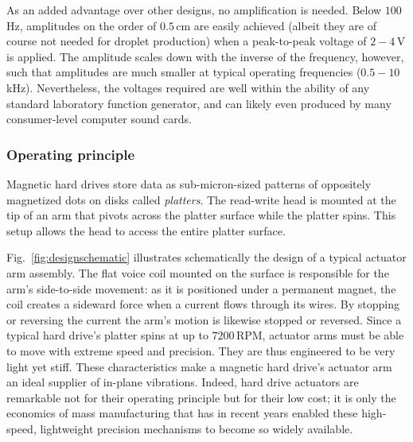 \documentclass[11.5pt]{book}
\newcommand*{\figref}[1]{Fig.~\ref{#1}}
\begin{document}
As an added advantage over other designs, no amplification is needed. Below
$100\,$Hz, amplitudes on the order of $0.5\,$cm are easily achieved (albeit they
are of course not needed for droplet production) when a peak-to-peak voltage of
$2-4\,$V is applied. The amplitude scales down with the inverse of the frequency,
however, such that amplitudes are much smaller at typical operating frequencies
($0.5-10\,$kHz). Nevertheless, the voltages required are well within the ability
of any standard laboratory function generator, and can likely even produced by many
consumer-level computer sound cards.

\subsubsection{Operating principle}
Magnetic hard drives store data as sub-micron-sized patterns of 
oppositely magnetized dots on disks called \emph{platters}. The read-write head
is mounted at the tip of an arm that pivots across the platter surface while the
platter spins. This setup allows the head to access the entire platter surface.

\figref{fig:designschematic} illustrates schematically the design of a typical
actuator arm assembly. The flat voice coil mounted on the surface is responsible
for the arm's side-to-side movement: as it is positioned under a permanent
magnet, the coil creates a sideward force when a current flows through its
wires. By stopping or reversing the current the arm's motion is likewise stopped
or reversed. Since a typical hard drive's platter spins at up to $7200\,$RPM,
actuator arms must be able to move with extreme speed and precision. They are
thus engineered to be very light yet stiff. These characteristics make a
magnetic hard drive's actuator arm an ideal supplier of in-plane vibrations.
Indeed, hard drive actuators are remarkable not for their operating principle
but for their low cost; it is only the economics of mass manufacturing that has
in recent years enabled these high-speed, lightweight precision mechanisms to
become so widely available.
\end{document}
